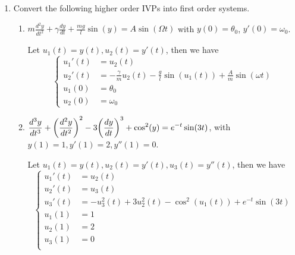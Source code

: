 \documentclass[10pt]{report}
\newcommand{\ds}{\displaystyle}
\DeclarePairedDelimiter\autoparen{(}{)}
\newcommand{\pa}[1]{\autoparen*{#1}}
\begin{document}
\begin{enumerate}
\begin{enumerate}
	\end{enumerate}

	\item 
	Convert the following higher order IVPs into first order systems.
	\begin{enumerate}
		\item 
		$\ds m\frac{d^2y}{dt^2} + \gamma \frac{dy}{dt} + \frac{mg}{l} \sin(y) = A\sin(\Omega t)$ with $y(0) = \theta_0$, $y'(0) = \omega_0$.
		
		Let $u_1(t) = y(t), u_2(t) = y'(t)$, then we have
		\[
		\left\{
		\begin{aligned}
			u_1'(t) &= u_2(t)\\
			u_2'(t) &= -\frac{\gamma}{m} u_2(t) - \frac{g}{l}\sin(u_1(t)) + \frac{A}{m}\sin(\omega t)\\
			u_1(0) &= \theta_0\\
			u_2(0) &= \omega_0
		\end{aligned}
		\right.
		\]
		
		\item
		$\ds \frac{d^3y}{dt^3} + \pa{\frac{d^2y}{dt^2}}^2 - 3\pa{\frac{dy}{dt}}^3 + \cos^2(y) = e^{-t}\sin(3t)$, with $y(1) = 1, y'(1) = 2, y''(1) = 0$.
		
		Let $u_1(t) = y(t), u_2(t) = y'(t), u_3(t) = y''(t)$, then we have
		\[
		\left\{
		\begin{aligned}
		u_1'(t) &= u_2(t)\\
		u_2'(t) &= u_3(t)\\
		u_3'(t) &= -u_3^2(t) + 3u_2^2(t) - \cos^2(u_1(t)) + e^{-t}\sin(3t)\\
		u_1(1) &= 1\\
		u_2(1) &= 2\\
		u_3(1) &= 0\\
		\end{aligned}
		\right.
		\]
	\end{enumerate}
\end{enumerate}
\end{document}
